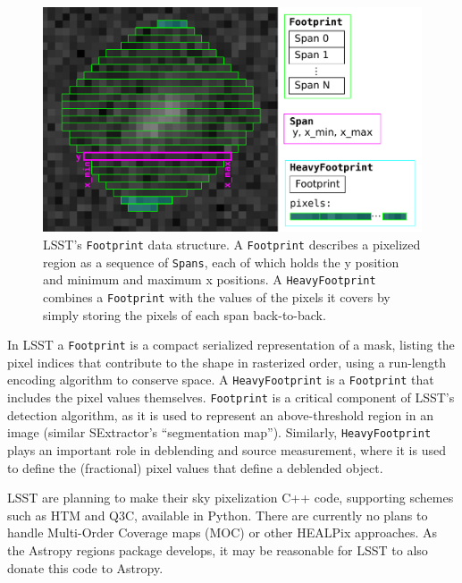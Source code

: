\documentclass[]{spie}  %
\begin{document}
\begin{figure} [t]
\begin{center}
\includegraphics[width=\textwidth]{footprint}
\end{center}
\caption[footprint]
{\label{fig:footprint}
LSST's \texttt{Footprint} data structure.
A \texttt{Footprint} describes a pixelized region as a sequence of \texttt{Spans}, each of which holds the y position and minimum and maximum x positions.  A \texttt{HeavyFootprint} combines a \texttt{Footprint} with the values of the pixels it covers by simply storing the pixels of each span back-to-back.}
\end{figure}

In LSST a \texttt{Footprint} is a compact serialized representation of a mask, listing the pixel indices that contribute to the shape in rasterized order, using a run-length encoding algorithm to conserve space.
A \texttt{HeavyFootprint} is a \texttt{Footprint} that includes the pixel values themselves.
\texttt{Footprint} is a critical component of LSST's detection algorithm, as it is used to represent an above-threshold region in an image (similar SExtractor's ``segmentation map'').
Similarly, \texttt{HeavyFootprint} plays an important role in deblending and source measurement, where it is used to define the (fractional) pixel values that define a deblended object.

LSST are planning to make their sky pixelization C++ code, supporting schemes such as HTM\cite{2001misk.conf..631K} and Q3C\cite{2006ASPC..351..735K}, available in Python.
There are currently no plans to handle Multi-Order Coverage maps (MOC)\cite{2012ASPC..461..347F,2014ivoa.spec.0602F} or other HEALPix approaches\cite{2015A&A...580A.132R}.
As the Astropy regions package develops, it may be reasonable for LSST to also donate this code to Astropy.
\end{document}
